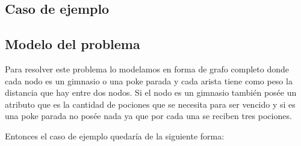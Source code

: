 \subsection{Caso de ejemplo}



\subsection{Modelo del problema}

Para resolver este problema lo modelamos en forma de grafo completo donde cada nodo es un gimnasio o una poke parada y cada arista tiene como peso la distancia que hay entre dos nodos. Si el nodo es un gimnasio también posée un atributo que es la cantidad de pociones que se necesita para ser vencido y si es una poke parada no posée nada ya que por cada una se reciben tres pociones.

Entonces el caso de ejemplo quedaría de la siguiente forma:

